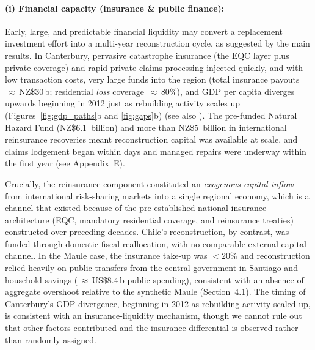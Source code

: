 \documentclass[12pt]{article}
\begin{document}
\paragraph{(i) Financial capacity (insurance \& public finance):}
Early, large, and predictable financial liquidity may convert a replacement investment effort into a multi-year reconstruction cycle, as suggested by the main results. In Canterbury, pervasive catastrophe insurance (the EQC layer plus private coverage) and rapid private claims processing injected quickly, and with low transaction costs, very large funds into the region (total insurance payouts $\,\approx\,$NZ\$30\,b; residential \emph{loss} coverage $\,\approx\,80\%$), and GDP per capita diverges upwards beginning in 2012 just as rebuilding activity scales up (Figures~\ref{fig:gdp_paths}b and \ref{fig:gaps}b) (see also \cite{nguyen2020insurance, parker2016five}). The pre-funded Natural Hazard Fund (NZ\$6.1~billion) and more than NZ\$5~billion in international reinsurance recoveries meant reconstruction capital was available at scale, and claims lodgement began within days and managed repairs were underway within the first year (see Appendix~E).

Crucially, the reinsurance component constituted an \textit{exogenous capital inflow} from international risk-sharing markets into a single regional economy, which is a channel that existed because of the pre-established national insurance architecture (EQC, mandatory residential coverage, and reinsurance treaties) constructed over preceding decades. Chile's reconstruction, by contrast, was funded through domestic fiscal reallocation, with no comparable external capital channel. In the Maule case, the insurance take-up was \(<20\%\) and reconstruction relied heavily on public transfers from the central government in Santiago and household savings ($\,\approx\,$US\$8.4\,b public spending), consistent with an absence of aggregate overshoot relative to the synthetic Maule (Section~4.1). The timing of Canterbury's GDP divergence, beginning in 2012 as rebuilding activity scaled up, is consistent with an insurance-liquidity mechanism, though we cannot rule out that other factors contributed and the insurance differential is observed rather than randomly assigned.
\end{document}
